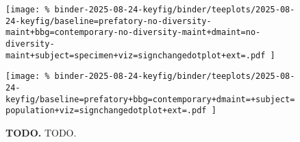 \begin{figure*}

\raisebox{0.95cm}{%
  \texttt{[image: \%
binder-2025-08-24-keyfig/binder/teeplots/2025-08-24-keyfig/baseline=prefatory+bbg=contemporary+dmaint=+subject=specimen+viz=signchangedotplot+ext=.pdf
]}%
}
%
\texttt{[image: \%
binder-2025-08-24-keyfig/binder/teeplots/2025-08-24-keyfig/baseline=prefatory-no-diversity-maint+bbg=contemporary-no-diversity-maint+dmaint=no-diversity-maint+subject=specimen+viz=signchangedotplot+ext=.pdf
]}

\vspace{-6ex}

\texttt{[image: \%
binder-2025-08-24-keyfig/binder/teeplots/2025-08-24-keyfig/baseline=prefatory+bbg=contemporary+dmaint=+subject=population+viz=signchangedotplot+ext=.pdf
]}

\vspace{-1ex}

\caption{
\textbf{TODO.}
TODO.
}
\label{fig:sign-change-prevatory-vs-contemporary}

\end{figure*}
